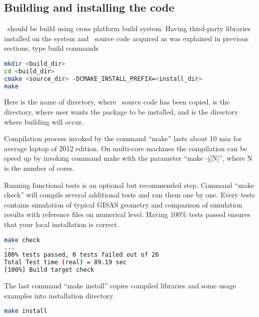 \subsection{Building and installing the code}

\BornAgain\ should be build using  cross platform build system. 
Having third-party libraries installed on the system and \BornAgain\ source code acquired as was explained in
previous sections, type build commands
\begin{lstlisting}[language=bash, style=commandline]
mkdir <build_dir>
cd <build_dir>
cmake <source_dir> -DCMAKE_INSTALL_PREFIX=<install_dir>
make
\end{lstlisting}
\vspace*{3mm}

Here  is the name of directory, where \BornAgain\ source code has been
copied,  is the directory, where user wants  the package
to be installed, and  is the directory where building will occur.


Compilation process invoked by the command ``make'' lasts about 10 min for average laptop
of 2012 edition. On multi-core machines the compilation can be speed up by invoking command
make with the parameter ``make -j[N]'', where N is the number of cores.

Running functional tests is an optional but recommended step. Command ``make check''
will compile several additional tests and run them one by one. Every tests contains
simulation of typical GISAS geometry and comparison of simulation results with reference files on numerical level. Having 100\% tests passed ensures that your local installation
is correct.
\begin{lstlisting}[language=bash, style=commandline]
make check
...
100% tests passed, 0 tests failed out of 26
Total Test time (real) = 89.19 sec
[100%] Build target check
\end{lstlisting}
\vspace*{3mm}


The last command ``make install'' copies compiled libraries and some usage examples
into  installation directory.
\begin{lstlisting}[language=bash, style=commandline]
make install
\end{lstlisting}
\vspace*{3mm}


